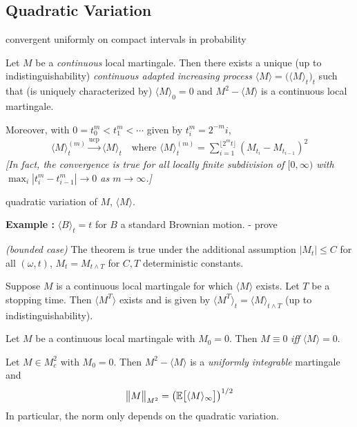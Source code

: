 \documentclass[10pt,a4paper]{article}
\begin{document}
\subsection{Quadratic Variation}

 convergent uniformly on compact intervals in probability 
\s

\thm Let $M$ be a \emph{continuous} local martingale. Then there exists a unique (up to indistinguishability) \emph{continuous adapted increasing process} $\langle M \rangle = \big( \langle M \rangle_t \big)_t$ such that (is uniquely characterized by) $\langle M \rangle_0 =0$ and $M^2 -\langle M \rangle$ is a continuous local martingale.

\quad Moreover, with $0=t_0^m < t_1^m < \cdots$ given by $t_i^m = 2^{-m}i$,
\begin{align*}
\langle M \rangle_t^{(m)} \xrightarrow{\text{ucp}} \langle M \rangle_t \quad \text{where } \langle M \rangle_t^{(m)} = \sum_{i=1}^{\lfloor 2^m t \rfloor} (M_{t_i} - M_{t_{i-1}})^2
\end{align*}
\emph{[In fact, the convergence is true for all locally finite subdivision of $[0, \infty)$ with $\max_i |t_i^m - t_{i-1}^m| \rightarrow 0$ as $m\rightarrow \infty$.]}
\s

 quadratic variation of $M$, $\langle M \rangle$.
\s

\textbf{Example :} $\langle B \rangle_t =t$ for $B$ a standard Brownian motion. - prove
\s

\lem \emph{(bounded case)} The theorem is true under the additional assumption $|M_t|\leq C$ for all $(\omega, t)$, $M_t = M_{t\wedge T}$ for $C,T$ deterministic constants.
\s

\lem Suppose $M$ is a continuous local martingale for which $\langle M \rangle$ exists. Let $T$ be a stopping time. Then $\langle M^T \rangle$ exists and is given by $\langle M^T\rangle_t = \langle M \rangle_{t\wedge T}$ (up to indistinguishability).
\s

\fact Let $M$ be a continuous local martingale with $M_0 =0$. Then $M\equiv 0$ \emph{iff} $\langle M \rangle =0$.
\s

\prop Let $M\in M^2_c$ with $M_0 =0$. Then $M^2 -\langle M \rangle$ is a \emph{uniformly integrable} martingale and
\begin{align*}
\bigl\lVert M\bigr\rVert_{M^2} = \big( \mathbb{E} \big[\langle M \rangle_{\infty} \big] \big)^{1/2}
\end{align*}
In particular, the norm only depends on the quadratic variation.
\end{document}
